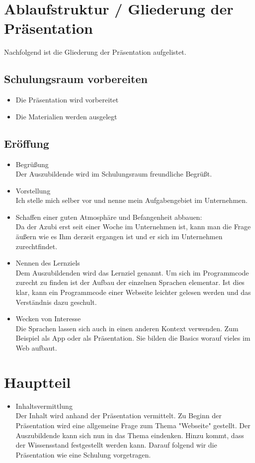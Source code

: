 \documentclass[a4paper, 12pt]{article}
\begin{document}
	\section{Ablaufstruktur / Gliederung der Präsentation}
	Nachfolgend ist die Gliederung der Präsentation aufgelistet.
	
	\subsection{Schulungsraum vorbereiten}
		\begin{itemize}
			\item Die Präsentation wird vorbereitet
			\item Die Materialien werden ausgelegt
		\end{itemize}
	\subsection{Eröffung}
		\begin{itemize}
			\item Begrüßung\\
			Der Auszubildende wird im Schulungsraum freundliche Begrüßt.
			\item Vorstellung\\
			Ich stelle mich selber vor und nenne mein Aufgabengebiet im Unternehmen.
			\item Schaffen einer guten Atmosphäre und Befangenheit abbauen:\\
			Da der Azubi erst seit einer Woche im Unternehmen ist, kann man die Frage äußern wie es Ihm derzeit ergangen ist und er sich im Unternehmen zurechtfindet.
			\item Nennen des Lernziels\\
			Dem Auszubildenden wird das Lernziel genannt. Um sich im Programmcode zurecht zu finden ist der Aufbau der einzelnen Sprachen elementar. Ist dies klar, kann ein Programmcode einer Webseite leichter gelesen werden und das Verständnis dazu geschult.
			\item Wecken von Interesse\\
			Die Sprachen lassen sich auch in einen anderen Kontext verwenden. Zum Beispiel als App oder als Präsentation. Sie bilden die Basics worauf vieles im Web aufbaut.
		\end{itemize}
	\section{Hauptteil}
	\begin{itemize}
		\item Inhaltsvermittlung\\
			Der Inhalt wird anhand der Präsentation vermittelt. Zu Beginn der Präsentation wird eine allgemeine Frage zum Thema "Webseite" gestellt. Der Auszubildende kann sich nun in das Thema eindenken. Hinzu kommt, dass der Wissensstand festgestellt werden kann. Darauf folgend wir die Präsentation wie eine Schulung vorgetragen.
	\end{itemize}
\end{document}
